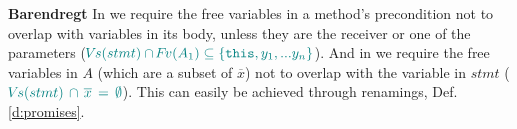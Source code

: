  \vspace{.1cm}

\noindent
\textbf{Barendregt} In  {} we  require   the free variables  in a method's precondition  not to overlap with variables in its body, unless they are the receiver or one of the parameters (${\color{teal}{{\hspace{-1pt}V\hspace{-1pt}}s(stmt) \cap {\hspace{-1pt}F\hspace{-1pt}}v(A_1) \subseteq   \{ \mbox{\normalfont{\texttt{this}}}, y_1, ... y_n \} }}$).  And in {} we require   the free variables in $A$ (which are a subset of  $\overline x$) not to overlap with the variable  in $stmt$ ($ {\color{teal}{ {\hspace{-1pt}V\hspace{-1pt}}s(stmt)\,  \cap\, \overline x\, =\, \emptyset}}$).
This can easily be achieved through renamings, \cf Def. \ref{d:promises}.





 
